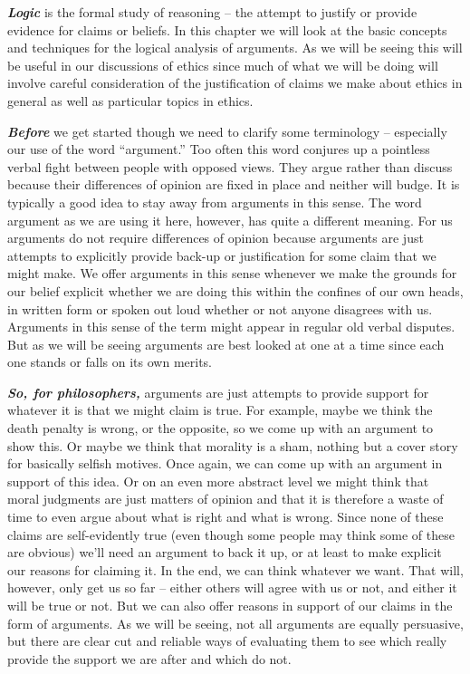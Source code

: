 \documentclass[12pt, openany]{book}
\begin{document}
\textbf{\emph{Logic}} is the formal study of reasoning -- the attempt to justify or provide evidence for claims or beliefs. In this chapter we will look at the basic concepts and techniques for the logical analysis of arguments. As we will be seeing this will be useful in our discussions of ethics since much of what we will be doing will involve careful consideration of the justification of claims we make about ethics in general as well as particular topics in ethics.

\textbf{\emph{Before}} we get started though we need to clarify some terminology -- especially our use of the word ``argument.'' Too often this word conjures up a pointless verbal fight between people with opposed views. They argue rather than discuss because their differences of opinion are fixed in place and neither will budge. It is typically a good idea to stay away from arguments in this sense. The word argument as we are using it here, however, has quite a different meaning. For us arguments do not require differences of opinion because arguments are just attempts to explicitly provide back-up or justification for some claim that we might make. We offer arguments in this sense whenever we make the grounds for our belief explicit whether we are doing this within the confines of our own heads, in written form or spoken out loud whether or not anyone disagrees with us. Arguments in this sense of the term might appear in regular old verbal disputes. But as we will be seeing arguments are best looked at one at a time since each one stands or falls on its own merits.

\textbf{\emph{So, for philosophers,}} arguments are just attempts to provide support for whatever it is that we might claim is true. For example, maybe we think the death penalty is wrong, or the opposite, so we come up with an argument to show this. Or maybe we think that morality is a sham, nothing but a cover story for basically selfish motives. Once again, we can come up with an argument in support of this idea. Or on an even more abstract level we might think that moral judgments are just matters of opinion and that it is therefore a waste of time to even argue about what is right and what is wrong. Since none of these claims are self-evidently true (even though some people may think some of these are obvious) we'll need an argument to back it up, or at least to make explicit our reasons for claiming it. In the end, we can think whatever we want. That will, however, only get us so far -- either others will agree with us or not, and either it will be true or not. But we can also offer reasons in support of our claims in the form of arguments. As we will be seeing, not all arguments are equally persuasive, but there are clear cut and reliable ways of evaluating them to see which really provide the support we are after and which do not.
\end{document}
